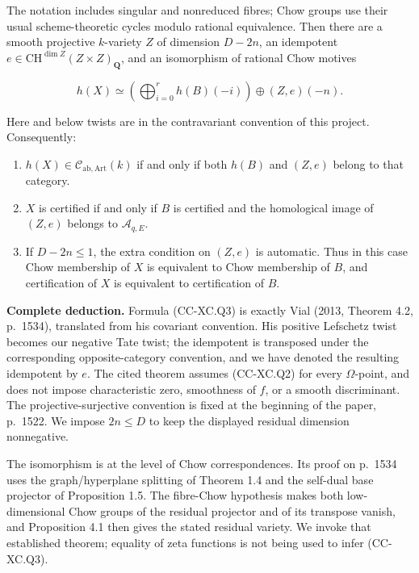 The notation includes singular and nonreduced fibres; Chow groups use
their usual scheme-theoretic cycles modulo rational equivalence. Then
there are a smooth projective \(k\)-variety \(Z\) of dimension \(D-2n\),
an idempotent \(e\in\mathrm{CH}^{\dim Z}(Z\times Z)_{\mathbf Q}\), and
an isomorphism of rational Chow motives

\[
 h(X)\simeq
 \left(\bigoplus_{i=0}^{r} h(B)(-i)\right)
       \oplus (Z,e)(-n).
 \tag{CC-XC.Q3}
\]

Here and below twists are in the contravariant convention of this
project. Consequently:

\begin{enumerate}
\def\labelenumi{\arabic{enumi}.}
\tightlist
\item
  \(h(X)\in\mathcal C_{\mathrm{ab,Art}}(k)\) if and only if both
  \(h(B)\) and \((Z,e)\) belong to that category.
\item
  \(X\) is certified if and only if \(B\) is certified and the
  homological image of \((Z,e)\) belongs to \(\mathcal A_{q,E}\).
\item
  If \(D-2n\le1\), the extra condition on \((Z,e)\) is automatic. Thus
  in this case Chow membership of \(X\) is equivalent to Chow membership
  of \(B\), and certification of \(X\) is equivalent to certification of
  \(B\).
\end{enumerate}

\textbf{Complete deduction.} Formula (CC-XC.Q3) is exactly Vial (2013,
Theorem 4.2, p.~1534), translated from his covariant convention. His
positive Lefschetz twist becomes our negative Tate twist; the idempotent
is transposed under the corresponding opposite-category convention, and
we have denoted the resulting idempotent by \(e\). The cited theorem
assumes (CC-XC.Q2) for every \(\Omega\)-point, and does not impose
characteristic zero, smoothness of \(f\), or a smooth discriminant. The
projective-surjective convention is fixed at the beginning of the paper,
p.~1522. We impose \(2n\le D\) to keep the displayed residual dimension
nonnegative.

The isomorphism is at the level of Chow correspondences. Its proof on
p.~1534 uses the graph/hyperplane splitting of Theorem 1.4 and the
self-dual base projector of Proposition 1.5. The fibre-Chow hypothesis
makes both low-dimensional Chow groups of the residual projector and of
its transpose vanish, and Proposition 4.1 then gives the stated residual
variety. We invoke that established theorem; equality of zeta functions
is not being used to infer (CC-XC.Q3).

